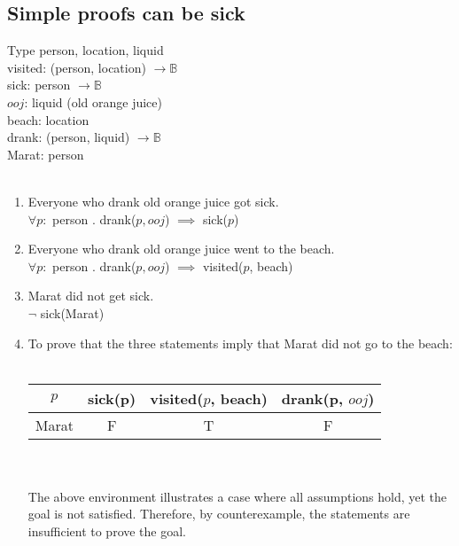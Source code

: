 \documentclass{assignment}
\begin{document}
  \begin{problem}
  \section{Simple proofs can be sick}
    Type person, location, liquid\\
    visited: (person, location) $\to \mathbb{B}$ \\
    sick: person $\to \mathbb{B}$\\
    $ooj$: liquid (old orange juice)\\
    beach: location\\
    drank: (person, liquid) $\to \mathbb{B}$\\
    Marat: person \\\\

    \begin{enumerate}
      \item Everyone who drank old orange juice got sick.\\
        $\forall p: $ person . drank($p, ooj$) $\implies$ sick($p$)
      \item Everyone who drank old orange juice went to the beach.\\
        $\forall p: $ person . drank($p, ooj$) $\implies$ visited($p$, beach)
      \item Marat did not get sick.\\
        $\neg$ sick(Marat)
      \item To prove that the three statements imply that Marat did not go to the beach:\\\\
        \begin{tabular}{ |c|c|c|c| } 
          \hline
          $p$ & sick(p) & visited($p$, beach) & drank(p, $ooj$) \\\hline
          Marat & F & T & F \\\hline
        \end{tabular}\\\\

        The above environment illustrates a case where all assumptions hold, yet the goal is not
        satisfied. Therefore, by counterexample, the statements are insufficient to prove the goal.

    \end{enumerate}
  \end{problem}
\end{document}
